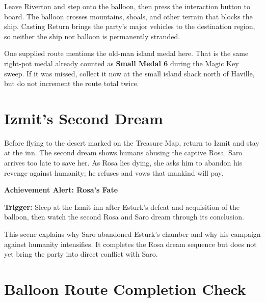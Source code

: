 \documentclass[
  american,
  10pt,
  letterpaper,
  oneside,
  open=any]{scrreprt}
\begin{document}
Leave Riverton and step onto the balloon, then press the interaction
button to board. The balloon crosses mountains, shoals, and other
terrain that blocks the ship. Casting Return brings the party's major
vehicles to the destination region, so neither the ship nor balloon is
permanently stranded.

One supplied route mentions the old-man island medal here. That is the
same right-pot medal already counted as \textbf{Small Medal 6} during
the Magic Key sweep. If it was missed, collect it now at the small
island shack north of Haville, but do not increment the route total
twice.

\section{Izmit's Second Dream}\label{izmits-second-dream}

Before flying to the desert marked on the Treasure Map, return to Izmit
and stay at the inn. The second dream shows humans abusing the captive
Rosa. Saro arrives too late to save her. As Rosa lies dying, she asks
him to abandon his revenge against humanity; he refuses and vows that
mankind will pay.

\begin{achievementalert}

\textbf{Achievement Alert: Rosa's Fate}

\textbf{Trigger:} Sleep at the Izmit inn after Esturk's defeat and
acquisition of the balloon, then watch the second Rosa and Saro dream
through its conclusion.

\end{achievementalert}

This scene explains why Saro abandoned Esturk's chamber and why his
campaign against humanity intensifies. It completes the Rosa dream
sequence but does not yet bring the party into direct conflict with
Saro.

\section{Balloon Route Completion
Check}\label{balloon-route-completion-check}
\end{document}
